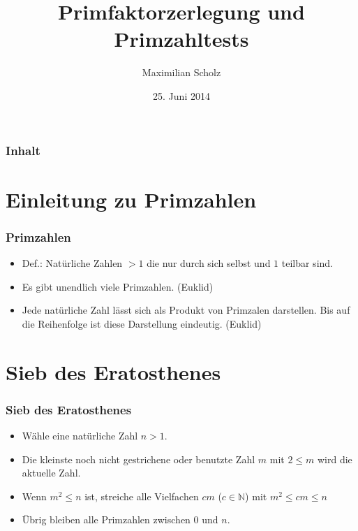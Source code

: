 \documentclass[mathserif, compress, german]{beamer}
\title{Primfaktorzerlegung und Primzahltests}    %
\author{Maximilian Scholz}                 %
\institute{Proseminar Mathematik}      %
\date{25. Juni 2014}                    %
\begin{document}
\begin{frame}
  \titlepage
\end{frame}

\section[]{}

\begin{frame}
  \frametitle{Inhalt}
  \tableofcontents
\end{frame}

\section{Einleitung zu Primzahlen}
  
\begin{frame}
  \frametitle{Primzahlen}
  \begin{itemize}
    \item Def.: Nat\"urliche Zahlen $> 1$ die nur durch sich selbst und $1$ teilbar sind.
      \vspace{3mm}
    \item Es gibt unendlich viele Primzahlen. (Euklid)
      \vspace{3mm}
    \item Jede nat\"urliche Zahl l\"asst sich als Produkt von Primzalen darstellen. 
	  Bis auf die Reihenfolge ist diese Darstellung eindeutig. (Euklid)
  \end{itemize}
\end{frame}

\section{Sieb des Eratosthenes}

\begin{frame}
  \frametitle{Sieb des Eratosthenes}   %

  \begin{itemize}
  \item<2-> W\"ahle eine nat\"urliche Zahl $n> 1$.
  \vspace{3mm}
  \item<3-> Die kleinste noch nicht gestrichene oder benutzte Zahl $m$ mit $2\leq m$ wird die aktuelle Zahl.
  \vspace{3mm}
  \item<4-> Wenn $m^2 \leq n$ ist, streiche alle Vielfachen $cm$ ($c \in \mathbb{N}$) mit $m^2 \leq cm \leq n$
  \vspace{3mm}
  \item<5-> \"Ubrig bleiben alle Primzahlen zwischen $0$ und $n$.
  \end{itemize}
\end{frame}
\end{document}
